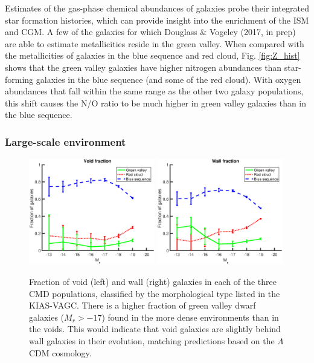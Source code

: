 Estimates of the gas-phase chemical abundances of galaxies probe their 
integrated star formation histories, which can provide insight into the 
enrichment of the ISM and CGM.  A few of the galaxies for which Douglass \& 
Vogeley (2017, in prep) are able to estimate metallicities reside in the green 
valley.  When compared with the metallicities of galaxies in the blue sequence 
and red cloud, Fig. \ref{fig:Z_hist} shows that the green valley galaxies have 
higher nitrogen abundances than star-forming galaxies in the blue sequence (and 
some of the red cloud).  With oxygen abundances that fall within the same range 
as the other two galaxy populations, this shift causes the N/O ratio to be much 
higher in green valley galaxies than in the blue sequence.


\subsubsection{Large-scale environment}

\begin{figure}
    \includegraphics[width=0.49\textwidth]{Images/GV/voidFrac_CMD}
    \includegraphics[width=0.49\textwidth]{Images/GV/wallFrac_CMD}
    \caption[Fraction of galaxies in CMD populations by morphological type]
    {Fraction of void (left) and wall (right) galaxies in each of the three CMD 
    populations, classified by the morphological type listed in the KIAS-VAGC.  
    There is a higher fraction of green valley dwarf galaxies ($M_r > -17$) 
    found in the more dense environments than in the voids.  This would indicate 
    that void galaxies are slightly behind wall galaxies in their evolution, 
    matching predictions based on the $\Lambda$CDM cosmology.}
    \label{fig:Mr_bin}
\end{figure}


